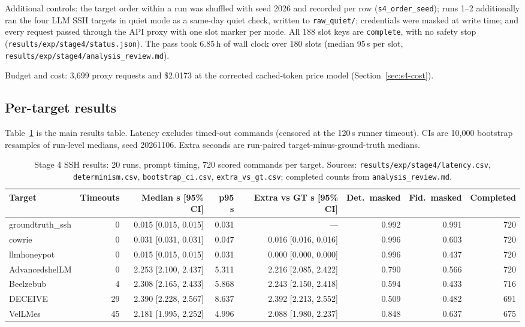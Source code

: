 \documentclass[a4paper,11pt]{article}
\begin{document}
Additional controls: the target order within a run was shuffled with seed
2026 and recorded per row (\texttt{s4\_order\_seed}); runs 1--2 additionally
ran the four LLM SSH targets in quiet mode as a same-day quiet check, written
to \texttt{raw\_quiet/}; credentials were masked at write time; and every
request passed through the API proxy with one slot marker per mode. All 188
slot keys are \texttt{complete}, with no safety stop
(\texttt{results/exp/stage4/status.json}). The pass took 6.85\,h of wall clock
over 180 slots (median 95\,s per slot,
\texttt{results/exp/stage4/analysis\_review.md}).

Budget and cost: 3,699 proxy requests and \$2.0173 at the corrected
cached-token price model (Section~\ref{sec:s4-cost}).

\subsection{Per-target results}

Table~\ref{tab:s4-ssh} is the main results table. Latency excludes timed-out
commands (censored at the 120\,s runner timeout). CIs are 10,000 bootstrap
resamples of run-level medians, seed 20261106. Extra seconds are run-paired
target-minus-ground-truth medians.

\begin{table}[ht]
\centering
\caption{Stage 4 SSH results: 20 runs, prompt timing, 720 scored commands per
target. Sources: \texttt{results/exp/stage4/latency.csv},
\texttt{determinism.csv}, \texttt{bootstrap\_ci.csv},
\texttt{extra\_vs\_gt.csv}; completed counts from
\texttt{analysis\_review.md}.}
\label{tab:s4-ssh}
\scriptsize
\setlength{\tabcolsep}{4pt}
\begin{tabular}{@{}l r r r r r r r@{}}
\toprule
Target & Timeouts & Median s [95\% CI] & p95 s & Extra vs GT s [95\% CI] & Det.\ masked & Fid.\ masked & Completed \\
\midrule
groundtruth\_ssh & 0 & 0.015 [0.015, 0.015] & 0.031 & --- & 0.992 & 0.991 & 720 \\
cowrie & 0 & 0.031 [0.031, 0.031] & 0.047 & 0.016 [0.016, 0.016] & 0.996 & 0.603 & 720 \\
llmhoneypot & 0 & 0.015 [0.015, 0.015] & 0.031 & 0.000 [0.000, 0.000] & 0.996 & 0.437 & 720 \\
AdvancedshelLM & 0 & 2.253 [2.100, 2.437] & 5.311 & 2.216 [2.085, 2.422] & 0.790 & 0.566 & 720 \\
Beelzebub & 4 & 2.308 [2.165, 2.433] & 5.868 & 2.243 [2.150, 2.418] & 0.594 & 0.433 & 716 \\
DECEIVE & 29 & 2.390 [2.228, 2.567] & 8.637 & 2.392 [2.213, 2.552] & 0.509 & 0.482 & 691 \\
VelLMes & 45 & 2.181 [1.995, 2.252] & 4.996 & 2.088 [1.980, 2.237] & 0.848 & 0.637 & 675 \\
\bottomrule
\end{tabular}
\end{table}
\end{document}
